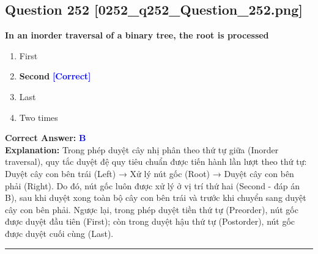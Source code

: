 \documentclass[11pt,a4paper]{article}
\begin{document}
\begin{minipage}{\textwidth}
\subsection*{Question 252 \quad \footnotesize{[0252\_q252\_Question\_252.png]}}
\noindent \textbf{In an inorder traversal of a binary tree, the root is processed}

\begin{enumerate}[label=\Alph*.]
    \item First
    \item \textbf{Second} \hfill \textcolor{blue}{\textbf{[Correct]}}
    \item Last
    \item Two times
\end{enumerate}

\noindent \textbf{Correct Answer:} \textcolor{blue}{\textbf{B}} \\[2pt]
\noindent \textbf{Explanation:} Trong phép duyệt cây nhị phân theo thứ tự giữa (Inorder traversal), quy tắc duyệt đệ quy tiêu chuẩn được tiến hành lần lượt theo thứ tự: Duyệt cây con bên trái (Left) → Xử lý nút gốc (Root) → Duyệt cây con bên phải (Right). Do đó, nút gốc luôn được xử lý ở vị trí thứ hai (Second - đáp án B), sau khi duyệt xong toàn bộ cây con bên trái và trước khi chuyển sang duyệt cây con bên phải. Ngược lại, trong phép duyệt tiền thứ tự (Preorder), nút gốc được duyệt đầu tiên (First); còn trong duyệt hậu thứ tự (Postorder), nút gốc được duyệt cuối cùng (Last).

\par\vspace{0.3cm}
\hrule
\vspace{0.3cm}
\end{minipage}
\end{document}
